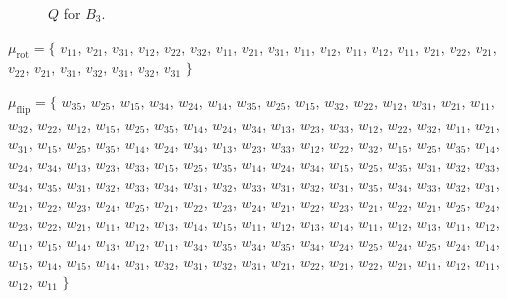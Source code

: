 \documentclass{amsart}
\theoremstyle{plain}
\theoremstyle{definition}
\theoremstyle{remark}
\newcommand{\muflip}{{\mu_{\text{flip}}}}
\newcommand{\murot}{{\mu_{\text{rot}}}}
\newlength\inlmutseqhang
\newcommand{\inlmutseq}[2]{%
  {\small%
    \settowidth\inlmutseqhang{$#1 = \big\{~$~}%
    \hangindent\inlmutseqhang%
    \noindent $#1 = \big\{$ #2 $\big\}$\par}%
}
\begin{document}
  \begin{figure}
    \centering 

    \caption{$Q$ for $B_3$.
      \label{fig:QB3}
    }
  \end{figure}

  \inlmutseq{\murot}{ $v_{1 1}$, $v_{2 1}$, $v_{3 1}$, $v_{1 2}$, $v_{2
      2}$, $v_{3 2}$, $v_{1 1}$, $v_{2 1}$, $v_{3 1}$, $v_{1 1}$, $v_{1
      2}$, $v_{1 1}$, $v_{1 2}$, $v_{1 1}$, $v_{2 1}$, $v_{2 2}$, $v_{2
      1}$, $v_{2 2}$, $v_{2 1}$, $v_{3 1}$, $v_{3 2}$, $v_{3 1}$, $v_{3
      2}$, $v_{3 1}$ }

  \inlmutseq{\muflip}{ $w_{3 5}$, $w_{2 5}$, $w_{1 5}$, $w_{3 4}$, $w_{2
      4}$, $w_{1 4}$, $w_{3 5}$, $w_{2 5}$, $w_{1 5}$, $w_{3 2}$, $w_{2
      2}$, $w_{1 2}$, $w_{3 1}$, $w_{2 1}$, $w_{1 1}$, $w_{3 2}$, $w_{2
      2}$, $w_{1 2}$, $w_{1 5}$, $w_{2 5}$, $w_{3 5}$, $w_{1 4}$, $w_{2
      4}$, $w_{3 4}$, $w_{1 3}$, $w_{2 3}$, $w_{3 3}$, $w_{1 2}$, $w_{2
      2}$, $w_{3 2}$, $w_{1 1}$, $w_{2 1}$, $w_{3 1}$, $w_{1 5}$, $w_{2
      5}$, $w_{3 5}$, $w_{1 4}$, $w_{2 4}$, $w_{3 4}$, $w_{1 3}$, $w_{2
      3}$, $w_{3 3}$, $w_{1 2}$, $w_{2 2}$, $w_{3 2}$, $w_{1 5}$, $w_{2
      5}$, $w_{3 5}$, $w_{1 4}$, $w_{2 4}$, $w_{3 4}$, $w_{1 3}$, $w_{2
      3}$, $w_{3 3}$, $w_{1 5}$, $w_{2 5}$, $w_{3 5}$, $w_{1 4}$, $w_{2
      4}$, $w_{3 4}$, $w_{1 5}$, $w_{2 5}$, $w_{3 5}$, $w_{3 1}$, $w_{3
      2}$, $w_{3 3}$, $w_{3 4}$, $w_{3 5}$, $w_{3 1}$, $w_{3 2}$, $w_{3
      3}$, $w_{3 4}$, $w_{3 1}$, $w_{3 2}$, $w_{3 3}$, $w_{3 1}$, $w_{3
      2}$, $w_{3 1}$, $w_{3 5}$, $w_{3 4}$, $w_{3 3}$, $w_{3 2}$, $w_{3
      1}$, $w_{2 1}$, $w_{2 2}$, $w_{2 3}$, $w_{2 4}$, $w_{2 5}$, $w_{2
      1}$, $w_{2 2}$, $w_{2 3}$, $w_{2 4}$, $w_{2 1}$, $w_{2 2}$, $w_{2
      3}$, $w_{2 1}$, $w_{2 2}$, $w_{2 1}$, $w_{2 5}$, $w_{2 4}$, $w_{2
      3}$, $w_{2 2}$, $w_{2 1}$, $w_{1 1}$, $w_{1 2}$, $w_{1 3}$, $w_{1
      4}$, $w_{1 5}$, $w_{1 1}$, $w_{1 2}$, $w_{1 3}$, $w_{1 4}$, $w_{1
      1}$, $w_{1 2}$, $w_{1 3}$, $w_{1 1}$, $w_{1 2}$, $w_{1 1}$, $w_{1
      5}$, $w_{1 4}$, $w_{1 3}$, $w_{1 2}$, $w_{1 1}$, $w_{3 4}$, $w_{3
      5}$, $w_{3 4}$, $w_{3 5}$, $w_{3 4}$, $w_{2 4}$, $w_{2 5}$, $w_{2
      4}$, $w_{2 5}$, $w_{2 4}$, $w_{1 4}$, $w_{1 5}$, $w_{1 4}$, $w_{1
      5}$, $w_{1 4}$, $w_{3 1}$, $w_{3 2}$, $w_{3 1}$, $w_{3 2}$, $w_{3
      1}$, $w_{2 1}$, $w_{2 2}$, $w_{2 1}$, $w_{2 2}$, $w_{2 1}$, $w_{1
      1}$, $w_{1 2}$, $w_{1 1}$, $w_{1 2}$, $w_{1 1}$ }
\end{document}
